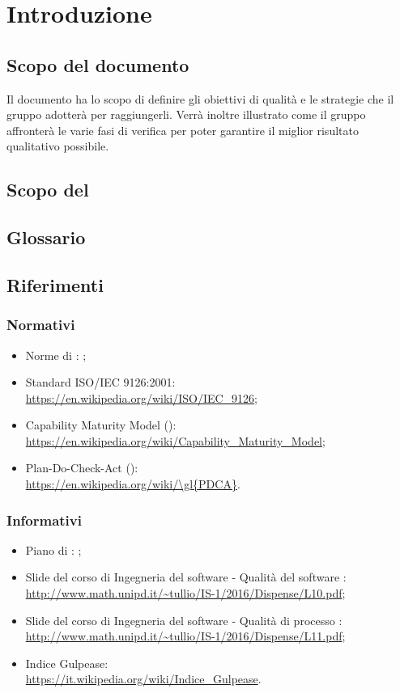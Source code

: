 \documentclass[PianoDiQualifica.tex]{subfiles}
\begin{document}
\section{Introduzione}
	\subsection{Scopo del documento}
		Il documento ha lo scopo di definire gli obiettivi di qualità e le strategie che il gruppo \GRUPPO{}
		adotterà per raggiungerli. Verrà inoltre illustrato come il gruppo affronterà le varie fasi di verifica
		per poter garantire il miglior risultato qualitativo possibile.
	\subsection{Scopo del }
		\SCOPO
	\subsection{Glossario}
		\GLOSSARIO
	\subsection{Riferimenti}
		\subsubsection{Normativi}
			\begin{itemize}
				\item Norme di : \NPdocRR{};
				\item Standard ISO/IEC 9126:2001: \\
				\url{https://en.wikipedia.org/wiki/ISO/IEC_9126};
				\item Capability Maturity Model (): \\
				\url{https://en.wikipedia.org/wiki/Capability_Maturity_Model};
				\item Plan-Do-Check-Act (): \\
				\url{https://en.wikipedia.org/wiki/\gl{PDCA}}.
			\end{itemize}
		\subsubsection{Informativi}
			\begin{itemize}
				\item Piano di : \PPdocRR{};
				\item Slide del corso di Ingegneria del software - Qualità del software : \\
				\url{http://www.math.unipd.it/~tullio/IS-1/2016/Dispense/L10.pdf};
				\item Slide del corso di Ingegneria del software - Qualità di processo : \\
				\url{http://www.math.unipd.it/~tullio/IS-1/2016/Dispense/L11.pdf};
				\item Indice Gulpease: \\
				\url{https://it.wikipedia.org/wiki/Indice_Gulpease}.
			\end{itemize}
			
\end{document}
